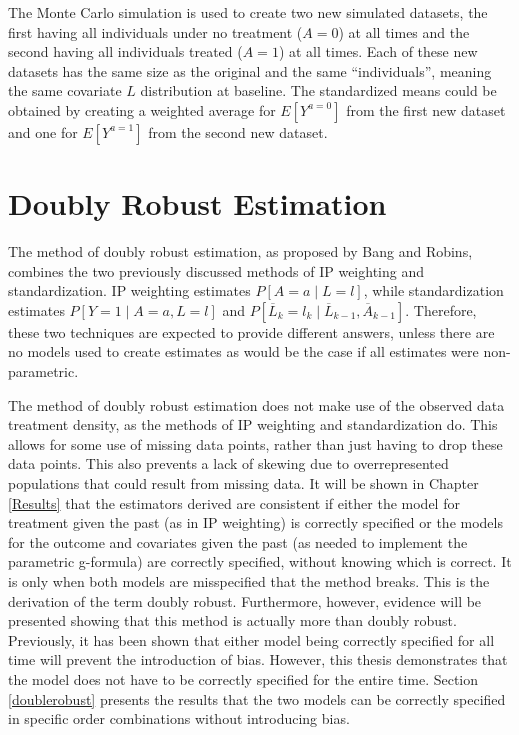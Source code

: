 The Monte Carlo simulation is used to create two new simulated datasets, the first having all individuals under no treatment ($A=0$) at all times and the second having all individuals treated ($A=1$) at all times.  Each of these new datasets has the same size as the original and the same ``individuals'', meaning the same covariate $L$ distribution at baseline.  The standardized means could be obtained by creating a weighted average for $E[Y^{a=0}]$ from the first new dataset and one for $E[Y^{a=1}]$ from the second new dataset.  

\section{Doubly Robust Estimation} 
The method of doubly robust estimation, as proposed by Bang and Robins,\cite{bang2005doubly} combines the two previously discussed methods of IP weighting and standardization.  IP weighting estimates $P[A=a \mid L =l]$, while standardization estimates $P[Y=1 \mid A = a, L=l]$ and $P[\overline{L}_k =l_k \mid \overline{L}_{k-1}, \overline{A}_{k-1}]$.  Therefore, these two techniques are expected to provide different answers, unless there are no models used to create estimates as would be the case if all estimates were non-parametric.  \cite{hernan_robins_2016}   

The method of doubly robust estimation does not make use of the observed data treatment density, as the methods of IP weighting and standardization do. This allows for some use of missing data points, rather than just having to drop these data points.  This also prevents a lack of skewing due to overrepresented populations that could result from missing data.  It will be shown in Chapter \ref{Results} that the estimators derived are consistent if either the model for treatment given the past (as in IP weighting) is correctly specified or the models for the outcome and covariates given the past (as needed to implement the parametric g-formula) are correctly specified, without knowing which is correct.  It is only when both models are misspecified that the method breaks.  This is the derivation of the term doubly robust.  Furthermore, however, evidence will be presented showing that this method is actually more than doubly robust.  Previously, it has been shown that either model being correctly specified for all time will prevent the introduction of bias.  However, this thesis demonstrates that the model does not have to be correctly specified for the entire time. Section \ref{doublerobust} presents the results that the two models can be correctly specified in specific order combinations without introducing bias.  

